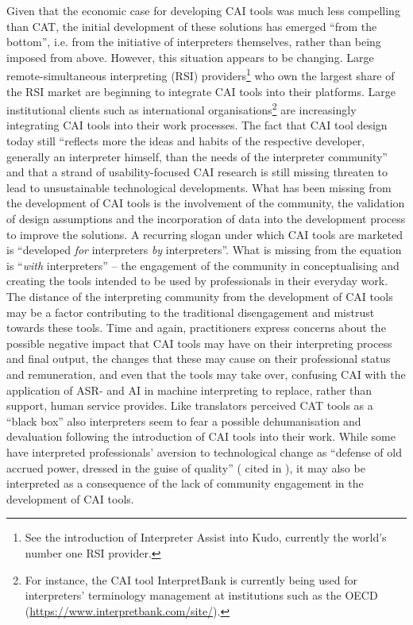 Given that the economic case for developing CAI tools was much less compelling than CAT, the initial development of these solutions has emerged ``from the bottom'', i.e. from the initiative of interpreters themselves, rather than being imposed from above. However, this situation appears to be changing. Large remote-simultaneous interpreting (RSI) providers\footnote{See the introduction of Interpreter Assist \citep{fantinuoli2022kudo} into Kudo, currently the world’s number one RSI provider.} who own the largest share of the RSI market are beginning to integrate CAI tools into their platforms. Large institutional clients such as international organisations\footnote{For instance, the CAI tool InterpretBank \citep{fantinuoli2016interpretbank} is currently being used for interpreters’ terminology management at institutions such as the OECD (\href{https://www.interpretbank.com/site/}{https://www.interpretbank.com/site/}).} are increasingly integrating CAI tools into their work processes. The fact that CAI tool design today still ``reflects more the ideas and habits of the respective developer, generally an interpreter himself, than the needs of the interpreter community'' \citep[164]{fantinuoli2018b} and that a strand of usability-focused CAI research is still missing threaten to lead to unsustainable technological developments. What has been missing from the development of CAI tools is the involvement of the community, the validation of design assumptions and the incorporation of data into the development process to improve the solutions. A recurring slogan under which CAI tools are marketed is ``developed \textit{for} interpreters \textit{by} interpreters''. What is missing from the equation is ``\textit{with} interpreters'' -- the engagement of the community in conceptualising and creating the tools intended to be used by professionals in their everyday work. The distance of the interpreting community from the development of CAI tools may be a factor contributing to the traditional disengagement and mistrust towards these tools. Time and again, practitioners express concerns about the possible negative impact that CAI tools may have on their interpreting process and final output, the changes that these may cause on their professional status and remuneration, and even that the tools may take over, confusing CAI with the application of ASR- and AI in machine interpreting to replace, rather than support, human service provides. Like translators perceived CAT tools as a “black box” \citep{o2012translation} also interpreters seem to fear a possible dehumanisation and devaluation following the introduction of CAI tools into their work. While some have interpreted professionals’ aversion to technological change as ``defense of old accrued power, dressed in the guise of quality'' (\citealt[4]{pym2011technology} cited in \citealt[155]{fantinuoli2018a}), it may also be interpreted as a consequence of the lack of community engagement in the development of CAI tools.\largerpage[2]

